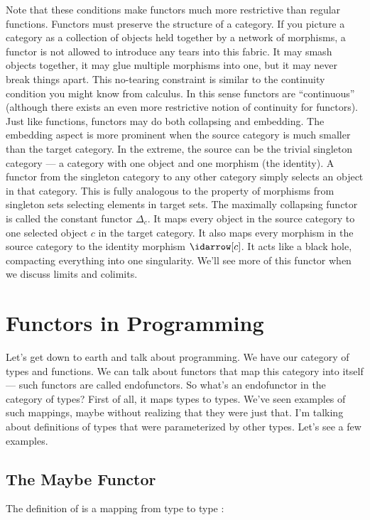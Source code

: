 \noindent
Note that these conditions make functors much more restrictive than regular functions.
Functors must preserve the structure of a category. If you picture a
category as a collection of objects held together by a network of
morphisms, a functor is not allowed to introduce any tears into this
fabric. It may smash objects together, it may glue multiple morphisms
into one, but it may never break things apart. This no-tearing
constraint is similar to the continuity condition you might know from
calculus. In this sense functors are ``continuous'' (although there
exists an even more restrictive notion of continuity for functors). Just
like functions, functors may do both collapsing and embedding. The
embedding aspect is more prominent when the source category is much
smaller than the target category. In the extreme, the source can be the
trivial singleton category --- a category with one object and one
morphism (the identity). A functor from the singleton category to any
other category simply selects an object in that category. This is fully
analogous to the property of morphisms from singleton sets selecting
elements in target sets. The maximally collapsing functor is called the
constant functor $\Delta_c$. It maps every object in the source
category to one selected object $c$ in the target category. It also
maps every morphism in the source category to the identity morphism
$\idarrow[c]$. It acts like a black hole, compacting
everything into one singularity. We'll see more of this functor when we
discuss limits and colimits.

\section{Functors in Programming}

Let's get down to earth and talk about programming. We have our category
of types and functions. We can talk about functors that map this
category into itself --- such functors are called endofunctors. So
what's an endofunctor in the category of types? First of all, it maps
types to types. We've seen examples of such mappings, maybe without
realizing that they were just that. I'm talking about definitions of
types that were parameterized by other types. Let's see a few examples.

\subsection{The Maybe Functor}

The definition of  is a mapping from type  to
type :

